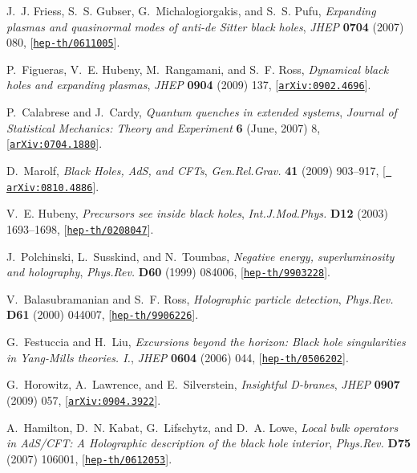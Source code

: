 \documentclass[12pt,a4paper]{article}
\begin{document}
\begin{thebibliography}{100}
J.~J. Friess, S.~S. Gubser, G.~Michalogiorgakis, and S.~S. Pufu, {\it
  {Expanding plasmas and quasinormal modes of anti-de Sitter black holes}},
  {\em JHEP} {\bf 0704} (2007) 080,
  [\href{http://xxx.lanl.gov/abs/hep-th/0611005}{{\tt hep-th/0611005}}].

P.~Figueras, V.~E. Hubeny, M.~Rangamani, and S.~F. Ross, {\it {Dynamical black
  holes and expanding plasmas}},  {\em JHEP} {\bf 0904} (2009) 137,
  [\href{http://xxx.lanl.gov/abs/0902.4696}{{\tt arXiv:0902.4696}}].

P.~{Calabrese} and J.~{Cardy}, {\it {Quantum quenches in extended systems}},
  {\em Journal of Statistical Mechanics: Theory and Experiment} {\bf 6} (June,
  2007) 8, [\href{http://xxx.lanl.gov/abs/0704.1880}{{\tt arXiv:0704.1880}}].

D.~Marolf, {\it {Black Holes, AdS, and CFTs}},  {\em Gen.Rel.Grav.} {\bf 41}
  (2009) 903--917, [\href{http://xxx.lanl.gov/abs/0810.4886}{{\tt
  arXiv:0810.4886}}].

V.~E. Hubeny, {\it {Precursors see inside black holes}},  {\em Int.J.Mod.Phys.}
  {\bf D12} (2003) 1693--1698,
  [\href{http://xxx.lanl.gov/abs/hep-th/0208047}{{\tt hep-th/0208047}}].

J.~Polchinski, L.~Susskind, and N.~Toumbas, {\it {Negative energy,
  superluminosity and holography}},  {\em Phys.Rev.} {\bf D60} (1999) 084006,
  [\href{http://xxx.lanl.gov/abs/hep-th/9903228}{{\tt hep-th/9903228}}].

V.~Balasubramanian and S.~F. Ross, {\it {Holographic particle detection}},
  {\em Phys.Rev.} {\bf D61} (2000) 044007,
  [\href{http://xxx.lanl.gov/abs/hep-th/9906226}{{\tt hep-th/9906226}}].

G.~Festuccia and H.~Liu, {\it {Excursions beyond the horizon: Black hole
  singularities in Yang-Mills theories. I.}},  {\em JHEP} {\bf 0604} (2006)
  044, [\href{http://xxx.lanl.gov/abs/hep-th/0506202}{{\tt hep-th/0506202}}].

G.~Horowitz, A.~Lawrence, and E.~Silverstein, {\it {Insightful D-branes}},
  {\em JHEP} {\bf 0907} (2009) 057,
  [\href{http://xxx.lanl.gov/abs/0904.3922}{{\tt arXiv:0904.3922}}].

A.~Hamilton, D.~N. Kabat, G.~Lifschytz, and D.~A. Lowe, {\it {Local bulk
  operators in AdS/CFT: A Holographic description of the black hole interior}},
   {\em Phys.Rev.} {\bf D75} (2007) 106001,
  [\href{http://xxx.lanl.gov/abs/hep-th/0612053}{{\tt hep-th/0612053}}].


\end{thebibliography}
\end{document}
